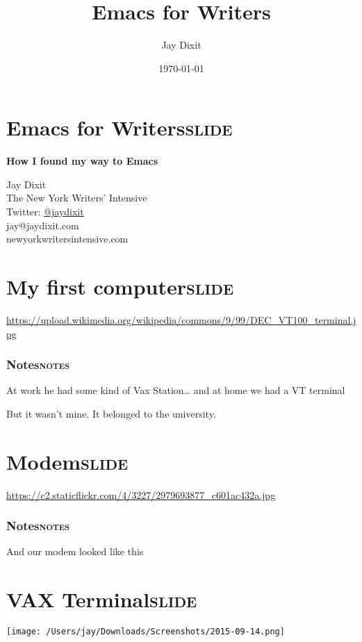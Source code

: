 \documentclass[11pt]{article}
\author{Jay Dixit}
\date{\today}
\title{Emacs for Writers}
\begin{document}
\maketitle
\tableofcontents
\newpage


\section{Emacs for Writers\hfill{}\textsc{slide}}
\label{sec:orgheadline1}
\textbf{How I found my way to Emacs} 

Jay Dixit  \\
The New York Writers' Intensive \\
Twitter: \href{http://twitter.com/jaydixit}{@jaydixit}  \\
jay@jaydixit.com \\
newyorkwritersintensive.com \\

\section{My first computer\hfill{}\textsc{slide}}
\label{sec:orgheadline3}

\url{https://upload.wikimedia.org/wikipedia/commons/9/99/DEC_VT100_terminal.jpg} 

\subsubsection{Notes\hfill{}\textsc{notes}}
\label{sec:orgheadline2}
At work he had some kind of Vax Station\ldots{}
and at home we had a VT terminal 

But it wasn't mine. It belonged to the university.

\section{Modem\hfill{}\textsc{slide}}
\label{sec:orgheadline5}
\url{https://c2.staticflickr.com/4/3227/2979693877_c601ac432a.jpg} 

\subsubsection{Notes\hfill{}\textsc{notes}}
\label{sec:orgheadline4}
And our modem looked like this 

\section{VAX Terminal\hfill{}\textsc{slide}}
\label{sec:orgheadline7}
\texttt{[image: /Users/jay/Downloads/Screenshots/2015-09-14.png]}
\end{document}
